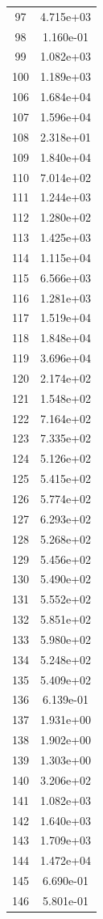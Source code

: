 \documentclass[12pt]{article}
\begin{document}
\begin{longtable}{@{}cc@{}}
97 & 4.715e+03 \\
98 & 1.160e-01 \\
99 & 1.082e+03 \\
100 & 1.189e+03 \\
106 & 1.684e+04 \\
107 & 1.596e+04 \\
108 & 2.318e+01 \\
109 & 1.840e+04 \\
110 & 7.014e+02 \\
111 & 1.244e+03 \\
112 & 1.280e+02 \\
113 & 1.425e+03 \\
114 & 1.115e+04 \\
115 & 6.566e+03 \\
116 & 1.281e+03 \\
117 & 1.519e+04 \\
118 & 1.848e+04 \\
119 & 3.696e+04 \\
120 & 2.174e+02 \\
121 & 1.548e+02 \\
122 & 7.164e+02 \\
123 & 7.335e+02 \\
124 & 5.126e+02 \\
125 & 5.415e+02 \\
126 & 5.774e+02 \\
127 & 6.293e+02 \\
128 & 5.268e+02 \\
129 & 5.456e+02 \\
130 & 5.490e+02 \\
131 & 5.552e+02 \\
132 & 5.851e+02 \\
133 & 5.980e+02 \\
134 & 5.248e+02 \\
135 & 5.409e+02 \\
136 & 6.139e-01 \\
137 & 1.931e+00 \\
138 & 1.902e+00 \\
139 & 1.303e+00 \\
140 & 3.206e+02 \\
141 & 1.082e+03 \\
142 & 1.640e+03 \\
143 & 1.709e+03 \\
144 & 1.472e+04 \\
145 & 6.690e-01 \\
146 & 5.801e-01 \\

\end{longtable}
\end{document}
